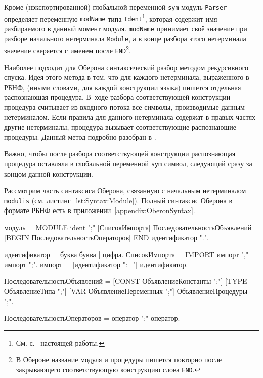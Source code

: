 \documentclass[utf8]{lgu}
\newcommand{\tire}{\unskip\nobreak\thinspace\textemdash\thinspace}
\newcommand{\code}[1]{{\normalsize\texttt{#1}}}
\newcommand{\codef}[1]{{\scriptsize\texttt{#1}}}
\begin{document}
Кроме (нэкспортированной) глобальной переменной \code{sym} модуль \code{Parser} определяет переменную \code{modName} типа \code{Ident}\footnote{См. с.~\pageref{ScannerIdentType} настоящей работы.}, которая содержит имя разбираемого в данный момент модуля. \code{modName} принимает своё значение при разборе начального нетерминала \code{Module}, а в конце разбора этого нетерминала значение сверяется с именем после \code{END}\footnote{В Обероне название модуля и процедуры пишется повторно после закрывающего соответствующую конструкцию слова \codef{END}.}.

Наиболее подходит для Оберона синтаксический разбор методом рекурсивного спуска. Идея этого метода в том, что для каждого нетерминала, выраженного в РБНФ, (иными словами, для каждой конструкции языка) пишется отдельная распознающая процедура. В~ходе разбора соответствующей конструкции процедура считывает из входного потока все символы, производимые данным нетерминалом. Если правила для данного нетерминала содержат в правых частях другие нетерминалы, процедура вызывает соответствующие распознающие процедуры. Данный метод подробно разобран в \cite{WirthCompiler,Sverdlov}.

Важно, чтобы после разбора соответствующей конструкции распознающая процедура оставляла в глобальной переменной \code{sym} символ, следующий сразу за концом данной конструкции.

Рассмотрим часть синтаксиса Оберона, связанную с начальным нетерминалом \code{modulis} (см. листинг~\ref{lst:Syntax:Module}). Полный синтаксис Оберона в формате РБНФ есть в приложении~\ref{appendix:OberonSyntax}.

\begin{listing}[H]
\caption{Модуль\tire начальный нетерминал в РБНФ}
\vspace{-17pt}
\label{lst:Syntax:Module}
\begin{ebnf}
модуль = MODULE ident ";" [СписокИмпорта]
         ПоследовательностьОбъявлений
         [BEGIN ПоследовательностьОператоров]
         END идентификатор ".".

идентификатор = буква {буква | цифра}.
СписокИмпорта = IMPORT импорт {"," импорт} ";".
импорт = [идентификатор ":="] идентификатор.

ПоследовательностьОбъявлений =
        [CONST {ОбъявлениеКонстанты ";"}]
        [TYPE {ОбъявлениеТипа ";"}]
        [VAR {ОбъявлениеПеременных ";"}]
        {ОбъявлениеПроцедуры ";"}.

ПоследовательностьОператоров = оператор {";" оператор}.
\end{ebnf}
\end{listing}
\end{document}
